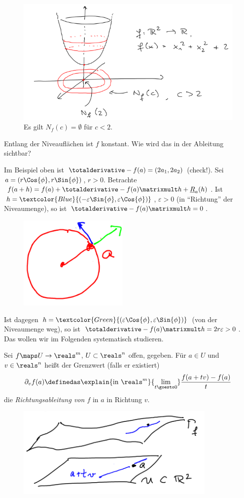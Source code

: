 \begin{beispiel*}
    \begin{figure}[H]
        \centering
        \includegraphics[width=0.5\linewidth]{figures/niveau_menge_beispiel}
        \caption*{Es gilt \( N_f(c)=\emptyset \) für \( c<2 \).}
        \label{fig:niveau_menge_beispiel}
    \end{figure}
    Entlang der Niveauflächen ist \( f \) konstant. Wie wird das in der Ableitung sichtbar?

    Im Beispiel oben ist \( \totalderivative-{f}(a)=(2a_1,2a_2) \) (check!). Sei \( a=(r\Cos{\phi}, r\Sin{\phi}) \), \( r>0 \). Betrachte \( f(a+h)=f(a)+\totalderivative-{f}(a)\matrixmult h+\underline{R}_a(h) \). Ist \( h=\textcolor{Blue}{(-\varepsilon \Sin{\phi}, \varepsilon \Cos{\phi})} \), \( \varepsilon>0 \) (in \enquote{Richtung} der Niveaumenge), so ist \( \totalderivative-{f}(a)\matrixmult h=0 \).
    \begin{figure}[H]
        \centering
        \includegraphics[width=0.2\linewidth]{figures/in_richtung_und_orthogonal_der_niveaumenge}
        \label{fig:in_richtung_und_orthogonal_der_niveaumenge}
    \end{figure}
    Ist dagegen \( h=\textcolor{Green}{(\varepsilon \Cos{\phi}, \varepsilon \Sin{\phi})} \) (von der Niveaumenge weg), so ist \( \totalderivative-{f}(a)\matrixmult h=2r\varepsilon>0 \). Das wollen wir im Folgenden systematisch studieren.
\end{beispiel*}
\begin{definition*}
    Sei \( f\maps U\to \reals^m \), \( U\subset \reals^n \) offen, gegeben. Für \( a\in U \) und \( v\in \reals^n \) heißt der Grenzwert (falls er existiert)
    \begin{align*}
        \partial_v f(a)\definedas \explain{\text{in \( \reals^m \)}}{\lim_{t \goesto 0}}\frac{f(a+tv)-f(a)}{t}
    \end{align*}
    die \emph{Richtungsableitung von \( f \)} in \( a \) in Richtung \( v \).
    \begin{figure}[H]
        \centering
        \includegraphics[width=0.5\linewidth]{figures/richtungsableitung}
        \label{fig:richtungsableitung}
    \end{figure}
\end{definition*}
